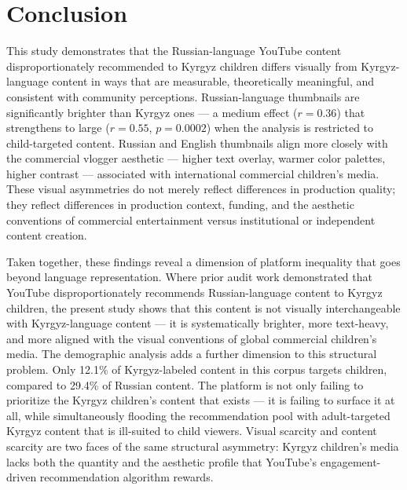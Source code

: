 \documentclass[12pt, letterpaper]{article}
\begin{document}
\section{Conclusion}

This study demonstrates that the Russian-language YouTube content disproportionately recommended to Kyrgyz children differs visually from Kyrgyz-language content in ways that are measurable, theoretically meaningful, and consistent with community perceptions. Russian-language thumbnails are significantly brighter than Kyrgyz ones — a medium effect ($r = 0.36$) that strengthens to large ($r = 0.55$, $p = 0.0002$) when the analysis is restricted to child-targeted content. Russian and English thumbnails align more closely with the commercial vlogger aesthetic — higher text overlay, warmer color palettes, higher contrast — associated with international commercial children's media. These visual asymmetries do not merely reflect differences in production quality; they reflect differences in production context, funding, and the aesthetic conventions of commercial entertainment versus institutional or independent content creation.

Taken together, these findings reveal a dimension of platform inequality that goes beyond language representation. Where prior audit work demonstrated that YouTube disproportionately recommends Russian-language content to Kyrgyz children, the present study shows that this content is not visually interchangeable with Kyrgyz-language content — it is systematically brighter, more text-heavy, and more aligned with the visual conventions of global commercial children's media. The demographic analysis adds a further dimension to this structural problem. Only 12.1\% of Kyrgyz-labeled content in this corpus targets children, compared to 29.4\% of Russian content. The platform is not only failing to prioritize the Kyrgyz children's content that exists — it is failing to surface it at all, while simultaneously flooding the recommendation pool with adult-targeted Kyrgyz content that is ill-suited to child viewers. Visual scarcity and content scarcity are two faces of the same structural asymmetry: Kyrgyz children's media lacks both the quantity and the aesthetic profile that YouTube's engagement-driven recommendation algorithm rewards.
\end{document}
